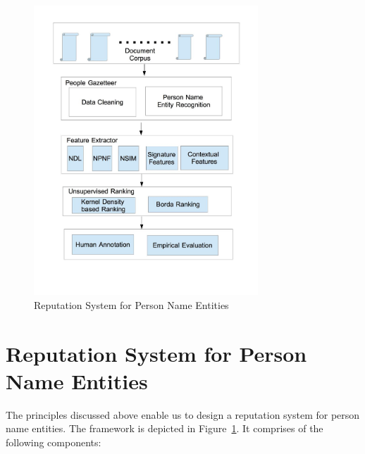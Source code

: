 \documentclass[a4paper,man,natbib]{apa6}
\begin{document}
\begin{figure}[!h]
\centering
\includegraphics[width=0.75\textwidth]{arch.jpg}
\caption{Reputation System for Person Name Entities}
\label{arch}
\end{figure}

\section{Reputation System for Person Name Entities}
\label{pnRep}

The principles discussed above enable us to design a reputation system for person name entities. The framework is depicted in Figure~\ref{arch}. It comprises of the following components: 
\end{document}
